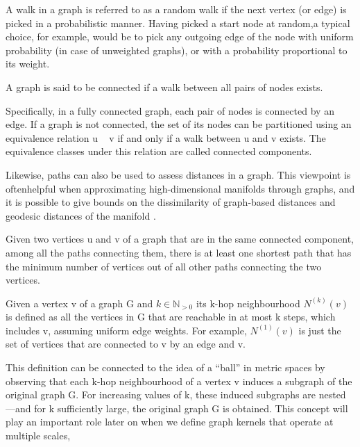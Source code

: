      \begin{mydef}
        A walk in a graph is referred to as a random walk if the next vertex (or edge) is picked in a probabilistic manner. 
        Having picked a start node at random,a typical choice, for example, would be to pick any outgoing edge of the node with uniform
        probability (in case of unweighted graphs), or with a probability proportional to its weight.
     \end{mydef}

     \begin{mydef}
        A graph is said to be connected if a walk between all pairs of nodes exists. 
        \begin{myRemark}
            Specifically, in a fully connected graph, each pair of nodes is connected by an edge. If a graph is not connected, the set of its nodes can be partitioned using an equivalence relation u ~ v if and only if a walk between u and v exists. The equivalence classes under this relation are called connected components.

            Likewise, paths can also be used to assess distances in a graph. This viewpoint is oftenhelpful when approximating high-dimensional manifolds through graphs, and it is possible to give bounds on the dissimilarity of graph-based distances and geodesic distances of the manifold .
        \end{myRemark}
     \end{mydef}

     \begin{mydef}
        Given two vertices u and v of a graph that are in the same connected component, among all the paths connecting them, there is at least one shortest path that has the minimum number of vertices out of all other paths connecting the two vertices.
     \end{mydef}

     \begin{mydef}
        Given a vertex v of a graph G and $ k \in \mathbb{N}_{>0} $ its k-hop neighbourhood  $N^{(k)} (v)$ is defined as all the vertices in G that are reachable
        in at most k steps, which includes v, assuming uniform edge weights.   For example, $N^{(1)} (v)$ is just the set of vertices that are connected to v by an edge and v.
        \begin{myRemark}
            This definition can be connected to the idea of a “ball” in metric spaces by observing that each k-hop neighbourhood of a vertex v induces a subgraph of the original graph G. For increasing values of k, these induced subgraphs are nested—and for k sufficiently large, the original graph G is obtained. This concept will play an important role later on when we define graph kernels that operate at multiple scales,
        \end{myRemark}
     \end{mydef}

